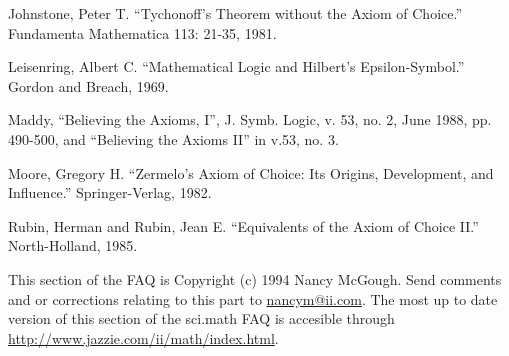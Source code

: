 Johnstone, Peter T.  ``Tychonoff's Theorem without the Axiom of
Choice.''  Fundamenta Mathematica 113: 21-35, 1981.

Leisenring, Albert C.  ``Mathematical Logic and Hilbert's
Epsilon-Symbol.''  Gordon and Breach, 1969.

Maddy, ``Believing the Axioms, I'', J. Symb. Logic, v. 53, no. 2, June
1988, pp. 490-500, and ``Believing the Axioms II'' in v.53, no. 3.

Moore, Gregory H.  ``Zermelo's Axiom of Choice: Its Origins,
Development, and Influence.''  Springer-Verlag, 1982.

Rubin, Herman and Rubin, Jean E.  ``Equivalents of the Axiom of Choice
II.''  North-Holland, 1985.

This section of the FAQ is Copyright (c) 1994 Nancy McGough.  Send
comments and or corrections relating to this part to
\url{nancym@ii.com}.  The most up to date version of this section of the
sci.math FAQ is accesible through
\url{http://www.jazzie.com/ii/math/index.html}.
